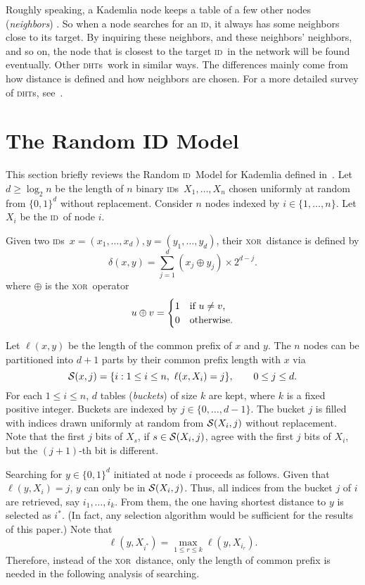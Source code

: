 \documentclass{article}
\newcommand{\idspace}{\{0,1\}^d}
\newcommand{\dht}{{\scshape dht}}
\newcommand{\dhts}{{\dht s}}
\newcommand{\id}{{\scshape id}}
\newcommand{\ids}{{\id s}}
\newcommand{\xor}{{\scshape xor}}
\newcommand\cS{{\cal S}}
\begin{document}
Roughly speaking, a Kademlia node keeps a table of a few other nodes
(\emph{neighbors}) .  So when a node
searches for an \id, it always has some neighbors close to its target.  By
inquiring these neighbors, and these neighbors' neighbors, and so on, the
node that is closest to the target \id\ in the network will be found
eventually. Other \dhts\ work in similar ways.  The differences mainly come
from how distance is defined and how neighbors are chosen. For a more detailed
survey of \dhts, see~\citep{Balakrishnan03}.

\section{The Random ID Model}

This section briefly reviews the Random \id\ Model for Kademlia defined
in~\citep{Cai2013}. Let $d \ge \log_2 n$ be the length of $n$ binary \ids\
$X_1,\ldots,X_n$ chosen uniformly at random from $\idspace$ without
replacement. Consider $n$ nodes indexed by $i \in \{1,\ldots,n\}$. Let $X_i$ be the
\id\ of node $i$. 

Given two \ids\ $x=(x_1,\ldots,x_d), y=(y_1,\ldots,y_d)$, their \xor\ 
distance is defined by 
$$
\delta(x,y) = \sum_{j=1}^d (x_j \oplus y_j) \times 2^{d-j}.
$$
where $\oplus$ is the \xor\ operator
\[
u \oplus v =
\begin{cases}
1  & \text{if $ u \ne v $,} \\
0 & \text{otherwise.}
\end{cases}
\]

Let $\ell(x,y)$ be the length of the common prefix of $x$ and $y$. The $n$
nodes can be partitioned into $d+1$ parts by their common prefix length with
$x$ via
$$
\cS(x,j) = \{i:1 \le i \le n,~\ell(x,X_i)=j\}, \qquad 0 \le j \le d.
$$
For each $1 \le i \le n$, $d$ tables (\emph{buckets}) of size  $k$ are
kept, where $k$ is a fixed positive integer. Buckets are indexed by $j \in
\{0,\ldots,d-1\}$.  The bucket $j$ is filled with \replaced{$\min\{k, |\cS(X_i,j)|\}$}{up to \(k\)} indices drawn
uniformly at random from $\cS(X_i,j)$ without replacement. Note that the first
$j$ bits of $X_s$, if $s \in \cS(X_i,j)$, agree with the first $j$ bits of
$X_i$, but the $(j+1)$-th bit is different.

Searching for $y \in \idspace$ initiated at node $i$ proceeds as follows. Given
that $\ell(y,X_i) = j$, $y$ can only be in $\cS(X_i,j)$. Thus, all indices from
the bucket $j$ of $i$ are retrieved, say $i_1,\ldots,i_k$. From them, the one
having shortest distance to $y$ is selected as $i^*$. (In fact, any selection
algorithm would be sufficient for the results of this paper.) Note that
$$
\ell(y,X_{i^*}) = \max_{1 \le r \le k}\ell(y,X_{i_r}).
$$
Therefore, instead of the \xor\ distance, only the length of common prefix is
needed in the following analysis of searching.
\end{document}
